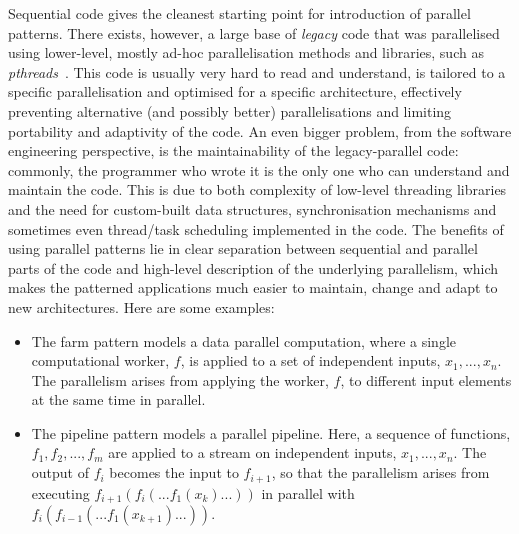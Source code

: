 Sequential code gives the cleanest starting point for introduction of parallel patterns. There exists, however, a large base of \emph{legacy} code  that was parallelised using lower-level, mostly ad-hoc parallelisation methods and libraries, such as \emph{pthreads}~\cite{10.5555/263953}. This code is usually very hard to read and understand, is tailored to a specific parallelisation and optimised for a specific architecture, effectively preventing alternative (and possibly better) parallelisations and limiting portability and adaptivity of the code. An even bigger problem, from the software engineering perspective, is the maintainability of the legacy-parallel code: commonly, the programmer who wrote it is the only one who can understand and maintain the code. This is due to both complexity of low-level threading libraries and the need for custom-built data structures, synchronisation mechanisms and sometimes even thread/task scheduling implemented in the code. 
%
The benefits of using parallel patterns lie in clear separation between sequential and parallel parts of the code and high-level description of the underlying parallelism, which makes the patterned applications much easier to maintain, change and adapt to new architectures. Here are some examples: 

\begin{itemize}
	\item The farm pattern models a data parallel computation, where a single computational worker, $f$, is applied to a set of independent inputs, $x_{1}, ..., x_{n}$. The parallelism arises from applying the worker, $f$, to different input elements at the same time in parallel. 
	\item The pipeline pattern models a parallel pipeline. Here, a sequence of functions, $f_{1}, f_{2}, ..., f_{m}$ are applied to a stream on independent inputs, $x_{1}, ..., x_{n}$. The output of $f_{i}$ becomes the input to $f_{i+1}$, so that the parallelism arises from executing $f_{i+1}(f_{i}(...f_{1}(x_{k})...))$ in parallel with $f_{i}(f_{i-1}(...f_{1}(x_{k+1})...))$.
\end{itemize}



  
